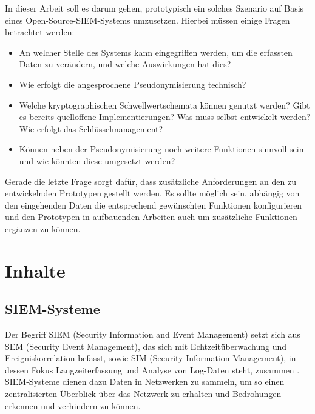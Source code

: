\documentclass[
    fontsize=12pt,
    headings=small,
    parskip=half,           %
    bibliography=totoc,
    numbers=noenddot,       %
    open=any,               %
    ]{scrreprt}
\begin{document}
In dieser Arbeit soll es darum gehen, prototypisch ein solches Szenario auf Basis eines Open-Source-SIEM-Systems umzusetzen. Hierbei müssen einige Fragen betrachtet werden:

\begin{itemize}
\item An welcher Stelle des Systems kann eingegriffen werden, um die erfassten Daten zu verändern, und welche Auswirkungen hat dies?
\item Wie erfolgt die angesprochene Pseudonymisierung technisch?
\item Welche kryptographischen Schwellwertschemata können genutzt werden? Gibt es bereits quelloffene Implementierungen? Was muss selbst entwickelt werden? Wie erfolgt das Schlüsselmanagement?
\item Können neben der Pseudonymisierung noch weitere Funktionen sinnvoll sein und wie könnten diese umgesetzt werden?
\end{itemize}

Gerade die letzte Frage sorgt dafür, dass zusätzliche Anforderungen an den zu entwickelnden Prototypen gestellt werden. Es sollte möglich sein, abhängig von den eingehenden Daten die entsprechend gewünschten Funktionen konfigurieren und den Prototypen in aufbauenden Arbeiten auch um zusätzliche Funktionen ergänzen zu können.


\chapter{Inhalte}

\section{SIEM-Systeme}

\label{sec_siem}



Der Begriff SIEM (Security Information and Event Management) setzt sich aus SEM (Security Event Management), das sich mit Echtzeitüberwachung und Ereigniskorrelation befasst, sowie SIM (Security Information Management), in dessen Fokus Langzeiterfassung und Analyse von Log-Daten steht, zusammen \cite{gartner2011}. SIEM-Systeme dienen dazu Daten in Netzwerken zu sammeln, um so einen zentralisierten Überblick über das Netzwerk zu erhalten und Bedrohungen erkennen und verhindern zu können. 
\end{document}
